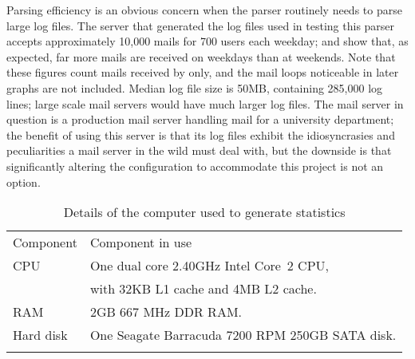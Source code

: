 Parsing efficiency is an obvious concern when the parser routinely needs to
parse large log files.  The server that generated the log files used in
testing this parser accepts approximately 10,000 mails for 700 users each
weekday;  and  show that, as expected, far more mails are
received on weekdays than at weekends.  Note that these figures count mails
received by  only, and the mail loops noticeable in later
graphs are not included.  Median log file size is 50MB, containing 285,000
log lines; large scale mail servers would have much larger log files.  The
mail server in question is a production mail server handling mail for a
university department; the benefit of using this server is that its log
files exhibit the idiosyncrasies and peculiarities a mail server in the
wild must deal with, but the downside is that significantly altering the
configuration to accommodate this project is not an option.



\begin{table}[thbp]
    \caption{Details of the computer used to generate statistics}
    \empty{}\label{Details of the computer used to generate statistics}
    \centering{}
    \begin{tabular}[]{ll}
        \tabletopline{}%
        Component  & Component in use                                   \\
        \tablemiddleline{}%
        CPU         & One dual core 2.40GHz Intel\textregistered{}
                        Core\texttrademark{}~2 CPU,                     \\
                    & with 32KB L1 cache and 4MB L2 cache.              \\
        RAM         & 2GB 667 MHz DDR RAM\@.                            \\
        Hard disk   & One Seagate Barracuda 7200 RPM 250GB SATA disk.   \\
        \tablebottomline{}%
    \end{tabular}
\end{table}

